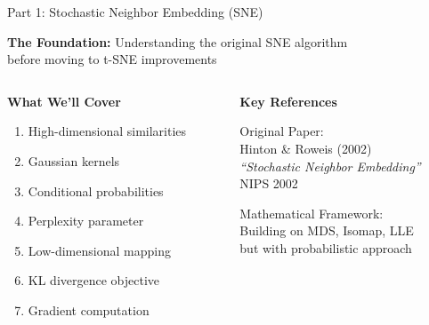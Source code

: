 \documentclass{beamer}
\begin{document}
\begin{frame}{Part 1: Stochastic Neighbor Embedding (SNE)}
\vspace{-0.2cm}

\begin{center}
\colorbox{upcblue!10}{
\begin{minipage}{0.85\textwidth}
\centering
\textbf{The Foundation:} Understanding the original SNE algorithm\\
before moving to t-SNE improvements
\end{minipage}
}
\end{center}

\vspace{0.3cm}
\begin{columns}[T]
\begin{column}{0.48\textwidth}
\textbf{\color{upcblue}What We'll Cover}
\vspace{0.2cm}

\begin{enumerate}
    \small
    \setlength\itemsep{0.3em}
    \item High-dimensional similarities
    \item Gaussian kernels
    \item Conditional probabilities
    \item Perplexity parameter
    \item Low-dimensional mapping
    \item KL divergence objective
    \item Gradient computation
\end{enumerate}
\end{column}

\begin{column}{0.48\textwidth}
\textbf{\color{upcblue}Key References}
\vspace{0.2cm}

\small
\textcolor{upcgray}{Original Paper:}\\
\footnotesize
Hinton \& Roweis (2002)\\
\textit{``Stochastic Neighbor Embedding''}\\
NIPS 2002

\vspace{0.3cm}
\textcolor{upcgray}{Mathematical Framework:}\\
\footnotesize
Building on MDS, Isomap, LLE\\
but with probabilistic approach

\vspace{0.3cm}
\begin{center}
\end{center}
\end{column}
\end{columns}


\end{frame}
\end{document}

